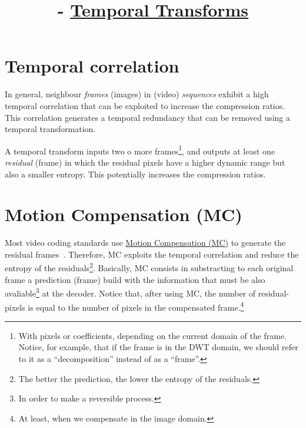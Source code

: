 


\title{\SM{} - \href{https://github.com/Sistemas-Multimedia/Sistemas-Multimedia.github.io/tree/master/contents/temporal_transforms}{Temporal Transforms}}

\maketitle
\tableofcontents

\section{Temporal correlation}

In general, neighbour \emph{frames} (images) in (video)
\emph{sequences} exhibit a high temporal correlation that can be
exploited to increase the compression ratios. This correlation
generates a temporal redundancy that can be removed using a temporal
transformation.

A temporal transform inputs two o more frames\footnote{With pixels or
  coefficients, depending on the current domain of the frame. Notice,
  for example, that if the frame is in the DWT domain, we should refer
  to it as a ``decomposition'' instead of as a ``frame''.}, and
outputs at least one \emph{residual} (frame) in which the residual
pixels have a higher dynamic range but also a smaller entropy. This
potentially increases the compression ratios.


\section{Motion Compensation (MC)}

Most video coding standards use
\href{https://en.wikipedia.org/wiki/Motion_compensation}{Motion
  Compensation (MC)} to generate the residual
frames~\cite{vruiz__MEC}. Therefore, MC exploits the temporal
correlation and reduce the entropy of the residuals\footnote{The
  better the prediction, the lower the entropy of the
  residuals.}. Basically, MC consists in substracting to each original
frame a prediction (frame) build with the information that must be
also avaliable\footnote{In order to make a reversible process.} at the
decoder. Notice that, after using MC, the number of residual-pixels is
equal to the number of pixels in the compensated frame.\footnote{At
  least, when we compensate in the image domain.}

